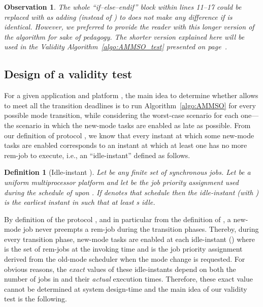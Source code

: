\documentclass{article}
\newtheorem{Definition}{Definition}
\newtheorem{validity test}{Validity Test}
\newtheorem{Observation}{Observation}
\begin{document}
\begin{Observation}
\label{obs:compressed_algorithm}
The whole ``if--else--endif'' block within lines 11--17 could be replaced with  as adding  (instead of ) to  does not make any difference if  is identical. However, we preferred to provide the reader with this longer version of the algorithm for sake of pedagogy. The shorter version explained here will be used in the Validity Algorithm~\ref{algo:AMMSO_test} presented on page~\pageref{algo:AMMSO_test}.
\end{Observation}

\subsection{Design of a validity test}
\label{sec:Multimode:AMMSO_validity_test}

For a given application  and platform , the main idea to determine whether  allows to meet all the transition deadlines is to run Algorithm~\ref{algo:AMMSO} for every possible mode transition, while considering the worst-case scenario for each one---the scenario in which the new-mode tasks are enabled as late as possible. From our definition of protocol , we know that every instant at which some new-mode tasks are enabled corresponds to an instant at which at least one  has no more rem-job to execute, i.e., an ``idle-instant'' defined as follows.

\begin{Definition}[Idle-instant ]
\label{def:Multimode:idle_instants}
Let  be any finite set of  synchronous jobs. Let  be a uniform multiprocessor platform and let  be the job priority assignment used during the schedule of  upon . If  denotes that schedule then the idle-instant  (with ) is the earliest instant in  such that at least  s idle. 
\end{Definition}

By definition of the protocol , and in particular from the definition of , a new-mode job never preempts a rem-job during the transition phases. Thereby, during every transition phase, new-mode tasks are enabled at each idle-instant  () where  is the set of rem-jobs at the  invoking time and  is the job priority assignment derived from the old-mode scheduler when the mode change is requested. For obvious reasons, the \emph{exact} values of these idle-instants depend on both the number of jobs in  and their \emph{actual} execution times. Therefore, these exact value cannot be determined at system design-time and the main idea of our validity test is the following. 
\end{document}
